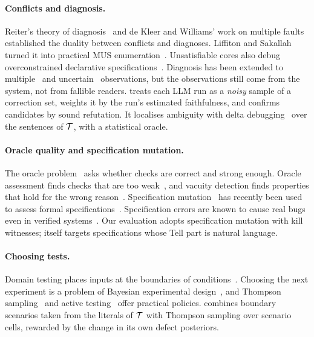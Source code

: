 \paragraph{Conflicts and diagnosis.} Reiter's theory of diagnosis~\cite{reiter1987theory} and de Kleer and Williams' work on multiple faults~\cite{kleer1987diagnosing} established the duality between conflicts and diagnoses. Liffiton and Sakallah turned it into practical MUS enumeration~\cite{liffiton2008algorithms,liffiton2016fast}. Unsatisfiable cores also debug overconstrained declarative specifications~\cite{shlyakhter2003debugging,torlak2008finding}. Diagnosis has been extended to multiple~\cite{ignatiev2019model} and uncertain~\cite{cazes2020model} observations, but the observations still come from the system, not from fallible readers. \specdx treats each LLM run as a \emph{noisy} sample of a correction set, weights it by the run's estimated faithfulness, and confirms candidates by sound refutation. It localises ambiguity with delta debugging~\cite{zeller2002simplifying} over the sentences of $\mathcal{T}$, with a statistical oracle.

\paragraph{Oracle quality and specification mutation.} The oracle problem~\cite{barr2015oracle} asks whether checks are correct and strong enough. Oracle assessment finds checks that are too weak~\cite{jahangirova2016test,schuler2011assessing}, and vacuity detection finds properties that hold for the wrong reason~\cite{kupferman2003vacuity}. Specification mutation~\cite{black2000mutation,jia2011analysis} has recently been used to assess formal specifications~\cite{amaral2026mutdafny}. Specification errors are known to cause real bugs even in verified systems~\cite{fonseca2017empirical}. Our evaluation adopts specification mutation with kill witnesses; \specdx itself targets specifications whose Tell part is natural language.

\paragraph{Choosing tests.} Domain testing places inputs at the boundaries of conditions~\cite{white1980domain}. Choosing the next experiment is a problem of Bayesian experimental design~\cite{rainforth2024modern}, and Thompson sampling~\cite{thompson1933likelihood,russo2018tutorial} and active testing~\cite{kossen2021active} offer practical policies. \specdx combines boundary scenarios taken from the literals of $\mathcal{T}$ with Thompson sampling over scenario cells, rewarded by the change in its own defect posteriors.
